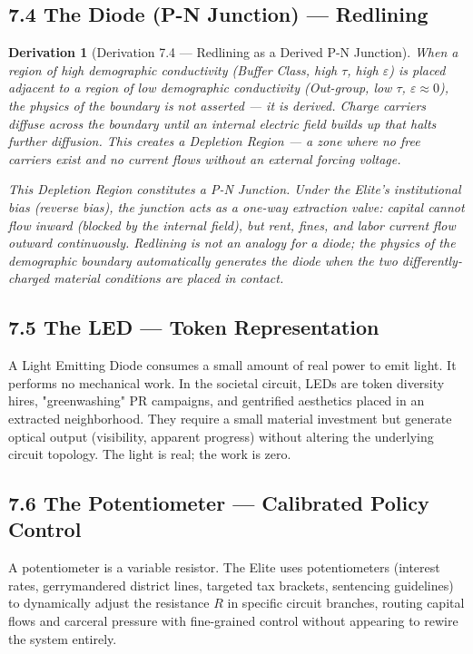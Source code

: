 \documentclass[12pt]{book}
\numberwithin{equation}{chapter}
\newtheorem{derivation}{Derivation}[chapter]
\begin{document}
\subsection{7.4 The Diode (P-N Junction) — Redlining}

\begin{derivation}[Derivation 7.4 — Redlining as a Derived P-N Junction]
When a region of high demographic conductivity (Buffer Class, high $\tau$, high $\varepsilon$) is placed adjacent to a region of low demographic conductivity (Out-group, low $\tau$, $\varepsilon \approx 0$), the physics of the boundary is not asserted — it is derived. Charge carriers diffuse across the boundary until an internal electric field builds up that halts further diffusion. This creates a \emph{Depletion Region} — a zone where no free carriers exist and no current flows without an external forcing voltage.
    \
\

    This Depletion Region constitutes a \emph{P-N Junction}. Under the Elite's institutional bias (reverse bias), the junction acts as a one-way extraction valve: capital cannot flow inward (blocked by the internal field), but rent, fines, and labor current flow outward continuously. Redlining is not an analogy for a diode; the physics of the demographic boundary \emph{automatically generates} the diode when the two differently-charged material conditions are placed in contact.
  \end{derivation}

\subsection{7.5 The LED — Token Representation}

    A Light Emitting Diode consumes a small amount of real power to emit light. It performs no mechanical work. In the societal circuit, LEDs are token diversity hires, "greenwashing" PR campaigns, and gentrified aesthetics placed in an extracted neighborhood. They require a small material investment but generate optical output (visibility, apparent progress) without altering the underlying circuit topology. The light is real; the work is zero.
  

\subsection{7.6 The Potentiometer — Calibrated Policy Control}

    A potentiometer is a variable resistor. The Elite uses potentiometers (interest rates, gerrymandered district lines, targeted tax brackets, sentencing guidelines) to dynamically adjust the resistance $R$ in specific circuit branches, routing capital flows and carceral pressure with fine-grained control without appearing to rewire the system entirely.
  
\end{document}
